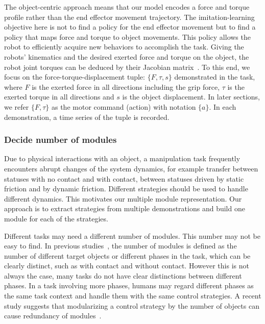 The object-centric approach means that our model encodes a force and
torque profile rather than the end effector movement trajectory.  The
imitation-learning objective here is not to find a policy for the end
effector movement but to find a policy that maps force and torque
to object movements. This policy allows the robot to efficiently
acquire new behaviors to accomplish the
task. %
Giving the robots' kinematics and the desired exerted force and torque
on the object, the robot joint torques can be deduced by their Jacobian
matrix~\citep{okamura2000overview}. To this end, we focus on the
force-torque-displacement tuple: $\{F,\tau,s\}$ demonstrated in the
task, where $F$ is the exerted force in all directions including the
grip force, $\tau$ is the exerted torque in all directions and $s$ is
the object displacement. In later sections, we refer $\{F,\tau\}$ as
the motor command (action) with notation $\{a\}$. In each
demonstration, a time series of the tuple is recorded.



\subsubsection{Decide number of modules}
\label{cha4:sec2:learn:cluster}

Due to physical interactions with an object, a manipulation task
frequently encounters abrupt changes of the system dynamics, for
example transfer between statuses with no contact and with contact,
between statuses driven by static friction and by
dynamic friction. Different strategies should be used to handle
different dynamics. This motivates our multiple module
representation. Our approach is to extract strategies from multiple
demonstrations and build one module for each of the
strategies.

Different tasks may need a different number of modules. This number may not be easy to find. In previous studies~\cite{haruno2001mosaic,sugimoto2012emosaic}, the number of modules is defined as the number of different target objects or different phases in the task, which can be clearly distinct, such as with contact and without contact. However this is not always the case, many tasks do not have clear distinctions between different phases.
In a task involving more phases, humans may regard different phases as the same task context and handle them with the same control strategies. A recent study suggests that modularizing a control strategy by the number of objects can cause redundancy of modules~\cite{lallee2009}.

